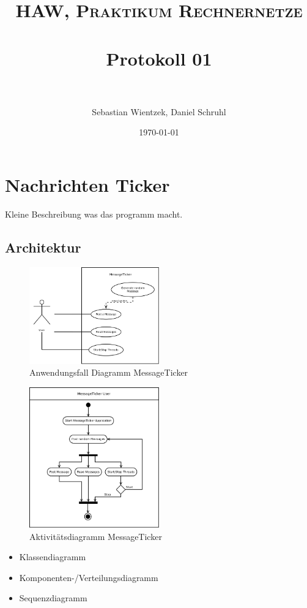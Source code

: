 \documentclass[paper=a4, fontsize=11pt]{scrreprt}
\title{	
	\normalfont \normalsize 
	\textsc{HAW, Praktikum Rechnernetze} \\ [25pt] 
	\horrule{0.5pt} \\[0.4cm]
	\huge Protokoll 01 \\
	\horrule{2pt} \\[0.5cm]
}
\author{Sebastian Wientzek, Daniel Schruhl}
\date{\normalsize\today}
\numberwithin{equation}{section}
\numberwithin{figure}{section}
\numberwithin{table}{section}
\begin{document}
\maketitle

\section{Nachrichten Ticker}

Kleine Beschreibung was das programm macht.

\subsection{Architektur}

\begin{figure}[!htb] 
  \centering
     \includegraphics[width=0.5\textwidth]{resources/use-case.png}
  \caption{Anwendungsfall Diagramm MessageTicker}
  \label{fig:use-case}
\end{figure}

\begin{figure}[!htb] 
  \centering
     \includegraphics[width=0.5\textwidth]{resources/activity.png}
  \caption{Aktivitätsdiagramm MessageTicker}
  \label{fig:use-case}
\end{figure}

\begin{itemize}
    \item Klassendiagramm
    \item Komponenten-/Verteilungsdiagramm
    \item Sequenzdiagramm
\end{itemize} 
\end{document}
